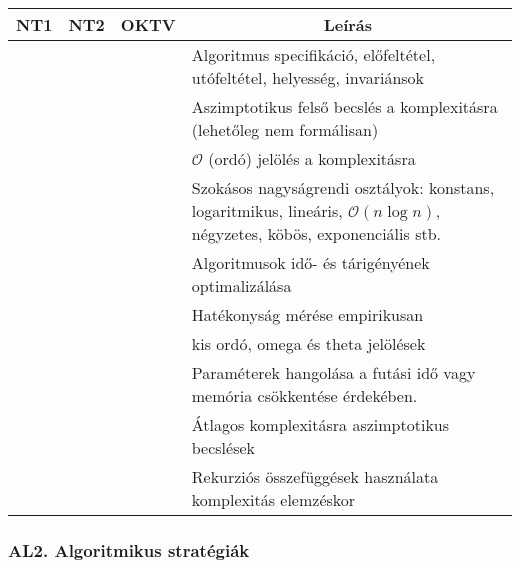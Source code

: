 \documentclass[a4paper,11pt,oneside]{article}
\newcommand{\cmark}{\ding{51}}%
\newcommand{\xmark}{\ding{55}}%
\newcommand{\cdefi}{{\small\cmark\faFileTextO}}
\newcommand{\ccode}{{\small\cmark\faFileText}}
\newcommand{\cnfoc}{{\small\faQuestion}}
\newcommand{\cexcl}{{\small\xmark}}
\newcommand{\ctable}[1]{
    \begin{center}
        \begin{longtable}{ | C | C | C | m{8cm} | }
        \hline
        \textbf{NT1} & \textbf{NT2} & \textbf{OKTV} & \multicolumn{1}{|c|}{\textbf{Leírás}} \\ \hline
        \endhead
        #1
        \end{longtable}
    \end{center}
}
\begin{document}
\ctable {
    \cdefi & \cdefi & \cdefi & Algoritmus specifikáció, előfeltétel, utófeltétel, helyesség, invariánsok
    \\ \hline %
    \ccode & \ccode & \ccode & Aszimptotikus felső becslés a komplexitásra (lehetőleg nem formálisan)
    \\ \hline %
    \cexcl & \ccode & \cdefi & $\mathcal{O}$ (ordó) jelölés a komplexitásra
    \\ \hline %
    \ccode & \ccode & \ccode & Szokásos nagyságrendi osztályok: konstans, logaritmikus, lineáris, $\mathcal{O}(n \log n)$, négyzetes, köbös, exponenciális stb.
    \\ \hline %
    \ccode & \ccode & \ccode & Algoritmusok idő- és tárigényének optimalizálása
    \\ \hline %
    \ccode & \ccode & \ccode & Hatékonyság mérése empirikusan
    \\ \hline %
    \cnfoc & \cnfoc & \cnfoc & kis ordó, omega és theta jelölések
    \\ \hline %
    \cnfoc & \cnfoc & \cnfoc & Paraméterek hangolása a futási idő vagy memória csökkentése érdekében.
    \\ \hline %
    \cexcl & \cexcl & \cexcl & Átlagos komplexitásra aszimptotikus becslések
    \\ \hline %
    \cexcl & \cexcl & \cexcl & Rekurziós összefüggések használata komplexitás elemzéskor
    \\ \hline %
}

\subsubsection*{AL2. Algoritmikus stratégiák} %
\end{document}

